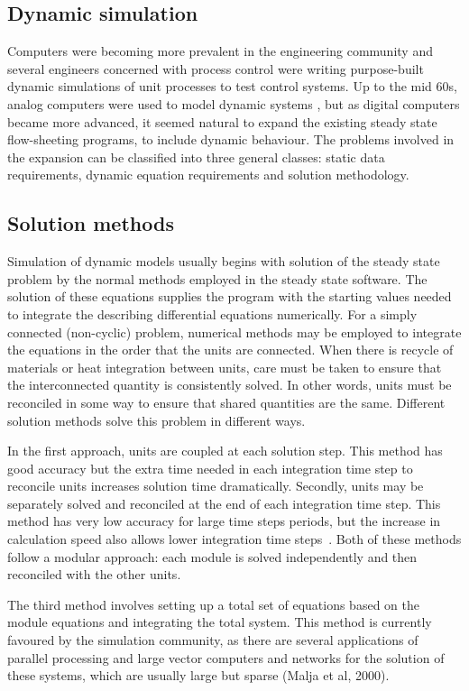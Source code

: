 \subsection{Dynamic simulation}
Computers were becoming more prevalent in the engineering community and several engineers concerned with process control were writing purpose-built dynamic simulations of unit processes to test control systems.  
Up to the mid 60s, analog computers were used to model dynamic systems \citep{husain1986chemical}, but as digital computers became more advanced, it seemed natural to expand the existing steady state flow-sheeting programs, to include dynamic behaviour. 
The problems involved in the expansion can be classified into three general classes: static data requirements, dynamic equation requirements and solution methodology.

\subsection{Solution methods}
Simulation of dynamic models usually begins with solution of the steady state problem by the normal methods employed in the steady state software.  
The solution of these equations supplies the program with the starting values needed to integrate the describing differential equations numerically.  
For a simply connected (non-cyclic) problem, numerical methods may be employed to integrate the equations in the order that the units are connected.  
When there is recycle of materials or heat integration between units, care must be taken to ensure that the interconnected quantity is consistently solved.  
In other words, units must be reconciled in some way to ensure that shared quantities are the same.  
Different solution methods solve this problem in different ways.

In the first approach, units are coupled at each solution step.  
This method has good accuracy but the extra time needed in each integration time step to reconcile units increases solution time dramatically.
Secondly, units may be separately solved and reconciled at the end of each integration time step.  
This method has very low accuracy for large time steps periods, but the increase in calculation speed also allows lower integration time steps~\citep{husain1986chemical}.  
Both of these methods follow a modular approach: each module is solved independently and then reconciled with the other units.

The third method involves setting up a total set of equations based on the module equations and integrating the total system.  
This method is currently favoured by the simulation community, as there are several applications of parallel processing and large vector computers and networks for the solution of these systems, which are usually large but sparse (Malja et al, 2000).

